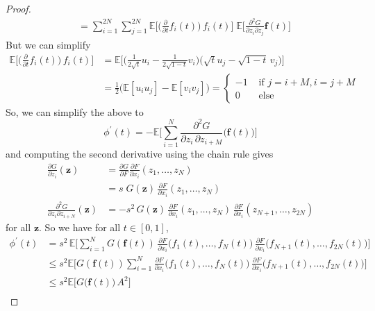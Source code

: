 \begin{proof}
\begin{align*}
      & = \sum_{i=1}^{2N} \sum_{j=1}^{2N} \mathbb{E} \bigg[ \Big( \frac{\partial}{\partial t} f_i (t) \Big) \, f_i (t) \bigg] \; \mathbb{E} \bigg[ \frac{\partial^2 G}{\partial z_i \partial z_{j}} \mathbf{f} (t) \bigg] 
  \end{align*}
  But we can simplify 
  \begin{align*}
      \mathbb{E} \bigg[ \Big( \frac{\partial}{\partial t} f_i (t) \Big) \, f_i (t) \bigg] & = \mathbb{E} \bigg[ \Big( \frac{1}{2 \sqrt{t}} u_i - \frac{1}{2 \sqrt{1 - t}} v_i \Big) \big( \sqrt{t} u_j - \sqrt{1 - t} \, v_j \big) \bigg] \\
      & = \frac{1}{2} \big(\mathbb{E}[ u_i u_j] - \mathbb{E}[v_i v_j] \big) = \begin{cases} -1 & \text{ if } j = i + M , i = j + M \\
      0 & \text{ else} \end{cases} 
  \end{align*}
  So, we can simplify the above to
  \[\phi^\prime (t) = - \mathbb{E} \bigg[  \sum_{i=1}^N \frac{\partial^2 G}{\partial z_i \, \partial z_{i + M}} \big( \mathbf{f}(t)\big) \bigg]\]
  and computing the second derivative using the chain rule gives 
  \begin{align*}
      \frac{\partial G}{\partial z_i} (\mathbf{z}) & = \frac{\partial G}{\partial F} \frac{\partial F}{\partial x_i} (z_1, \ldots, z_N) \\
      & = s \; G(\mathbf{z}) \, \frac{\partial F}{\partial x_i} (z_1, \ldots, z_N) \\
      \frac{\partial^2 G}{\partial z_i \partial z_{i + N}} (\mathbf{z}) & = - s^2 \, G(\mathbf{z}) \, \frac{\partial F}{\partial x_i} (z_1, \ldots, z_N) \, \frac{\partial F}{\partial x_i} (z_{N+1}, \ldots, z_{2N}) 
  \end{align*}
  for all $\mathbf{z}$. So we have for all $t \in [0, 1]$, 
  \begin{align*}
      \phi^\prime (t) & = s^2 \, \mathbb{E} \bigg[ \sum_{i=1}^N G(\mathbf{f}(t)) \, \frac{\partial F}{\partial x_i} \big( f_1 (t), \ldots, f_N (t) \big) \, \frac{\partial F}{\partial x_i} \big( f_{N+1} (t), \ldots, f_{2N} (t) \big) \bigg] \\ 
      & \leq s^2 \mathbb{E} \bigg[ G(\mathbf{f}(t)) \sum_{i=1}^N \frac{\partial F}{\partial x_i} \big( f_1 (t), \ldots, f_N (t) \big) \, \frac{\partial F}{\partial x_i} \big( f_{N+1} (t), \ldots, f_{2N} (t) \big) \bigg] \\ 
      & \leq s^2 \mathbb{E} \big[ G(\mathbf{f}(t) \big) \, A^2 \big] \\

\end{align*}
\end{proof}

